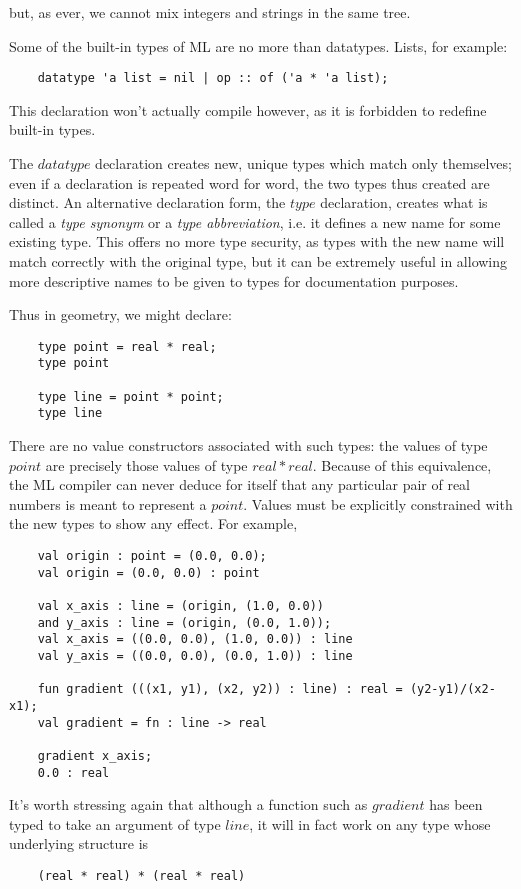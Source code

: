 but, as ever, we cannot mix integers and strings in the same tree.

Some of the built-in types of ML are no more than datatypes. Lists, for
example:
\begin{verbatim}
    datatype 'a list = nil | op :: of ('a * 'a list);
\end{verbatim}

This declaration won't actually compile however, as it is forbidden to
redefine built-in types.

The $datatype$ declaration creates new, unique types which match only
themselves; even if a declaration is repeated word for word, the two
types thus created are distinct. An alternative declaration form, the
$type$ declaration, creates what is called a {\em type synonym} or a {\em type
abbreviation}, i.e. it defines a new name for some existing type. This
offers no more type security, as types with the new name will match
correctly with the original type, but it can be extremely useful in
allowing more descriptive names to be given to types for documentation
purposes.

Thus in geometry, we might declare:
\begin{verbatim}
    type point = real * real;
    type point

    type line = point * point;
    type line
\end{verbatim}

There are no value constructors associated with such types: the values
of type $point$ are precisely those values of type $real * real$.
Because of this equivalence, the ML compiler can never deduce for itself
that any particular pair of real numbers is meant to represent a
$point$. Values must be explicitly constrained with the new types to
show any effect. For example,
\begin{verbatim}
    val origin : point = (0.0, 0.0);
    val origin = (0.0, 0.0) : point

    val x_axis : line = (origin, (1.0, 0.0))
    and y_axis : line = (origin, (0.0, 1.0));
    val x_axis = ((0.0, 0.0), (1.0, 0.0)) : line
    val y_axis = ((0.0, 0.0), (0.0, 1.0)) : line

    fun gradient (((x1, y1), (x2, y2)) : line) : real = (y2-y1)/(x2-x1);
    val gradient = fn : line -> real

    gradient x_axis;
    0.0 : real
\end{verbatim}

It's worth stressing again that although a function such as $gradient$
has been typed to take an argument of type $line$, it will in fact work
on any type whose underlying structure is
\begin{verbatim}
    (real * real) * (real * real)
\end{verbatim}

